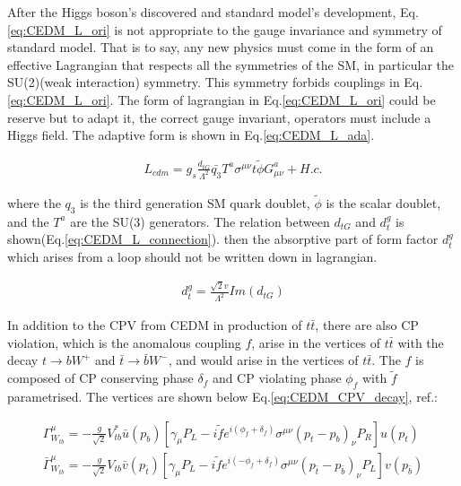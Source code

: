 		After the Higgs boson's discovered and standard model's development, Eq.\ref{eq:CEDM_L_ori} is not appropriate to the gauge invariance and symmetry of standard model. That is to say, any new physics must come in the form of an effective Lagrangian that respects all the symmetries of the SM, in particular the SU(2)(weak interaction) symmetry. This symmetry forbids couplings in Eq.\ref{eq:CEDM_L_ori}. The form of lagrangian in Eq.\ref{eq:CEDM_L_ori} could be reserve but to adapt it, the correct gauge invariant, operators must include a Higgs field. The adaptive form is shown in Eq.\ref{eq:CEDM_L_ada}.

		\begin{equation}
		\begin{split}
		L_{cdm} = g_s \frac{d_{tG}}{\Lambda^2} \bar{q_3} T^a\sigma^{\mu \nu} t \widetilde{\phi} G^a_{\mu \nu} + H.c.
		\label{eq:CEDM_L_ada}
		\end{split}
		\end{equation}
		\FloatBarrier

		where the $q_3$ is the third generation SM quark doublet, $\widetilde{\phi}$ is the scalar doublet, and the $T^a$ are the SU(3) generators. The relation between $d_{tG}$ and $d_t^g$ is shown(Eq.\ref{eq:CEDM_L_connection}). then the absorptive part of form factor $d_t^g$ which arises from a loop should not be written down in lagrangian.

		\begin{equation}
		\begin{split}
		d_t^g = \frac{\sqrt{2} v}{\Lambda^2} Im(d_{tG})
		\label{eq:CEDM_L_connection}
		\end{split}
		\end{equation}
		\FloatBarrier

		In addition to the CPV from CEDM in production of $t\bar{t}$, there are also CP violation, which is the anomalous coupling $f$, arise in the vertices of $t\bar{t}$ with the decay $t \rightarrow bW^+$ and $\bar{t} \rightarrow \bar{b}W^-$, and would arise in the vertices of $t\bar{t}$. The $f$ is composed of CP conserving phase $\delta_f$ and CP violating phase $\phi_{f}$ with $\widetilde{f}$ parametrised. The vertices are shown below Eq.\ref{eq:CEDM_CPV_decay}, ref.\cite{PhysRevD.81.034013}:

		\begin{equation}
		\begin{split}
		\Gamma^{\mu}_{W_{tb}} = - \frac{g}{\sqrt{2}}V_{tb}^{*} \bar{u}(p_{b})[ \gamma_{\mu} P_{L} - i\widetilde{f}e^{i(\phi_f + \delta_f)} \sigma^{\mu \nu} (p_t - p_b)_{\nu} P_R ] u(p_t) \\
		\bar{\Gamma}^{\mu}_{W_{tb}} = - \frac{g}{\sqrt{2}}V_{tb} \bar{v}(p_{\bar{t}})[ \gamma_{\mu} P_{L} - i\widetilde{f}e^{i(-\phi_f + \delta_f)} \sigma^{\mu \nu} (p_{\bar{t}} - p_{\bar{b}})_{\nu} P_L ] v(p_{\bar{b}})
		\end{split}
		\label{eq:CEDM_CPV_decay}
		\end{equation}
		\FloatBarrier

